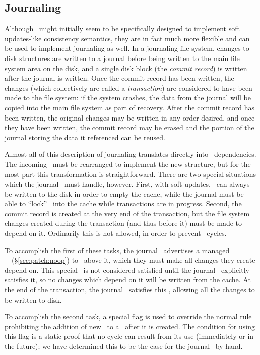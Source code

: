 \subsection{Journaling}
\label{sec:using:journal}

Although \chdescs\ might initially seem to be specifically designed to implement
soft updates-like consistency semantics, they are in fact much more flexible and
can be used to implement journaling as well. In a journaling file system,
changes to disk structures are written to a journal before being written to the
main file system area on the disk, and a single disk block (the \emph{commit
record}) is written after the journal is written. Once the commit record has
been written, the changes (which collectively are called a \emph{transaction})
are considered to have been made to the file system: if the system crashes, the
data from the journal will be copied into the main file system as part of
recovery. After the commit record has been written, the original changes may be
written in any order desired, and once they have been written, the commit record
may be erased and the portion of the journal storing the data it referenced can
be reused.

Almost all of this description of journaling translates directly into \chdesc\
dependencies. The incoming \chdescs\ must be rearranged to implement the new
structure, but for the most part this transformation is straightforward. There
are two special situations which the journal \module\ must handle, however.
First, with soft updates, \chdescs\ can always be written to the disk in order
to empty the cache, while the journal must be able to ``lock'' \chdescs\ into
the cache while transactions are in progress. Second, the commit record is
created at the very end of the transaction, but the file system changes created
during the transaction (and thus before it) must be made to depend on it.
Ordinarily this is not allowed, in order to prevent \chdesc\ cycles.

To accomplish the first of these tasks, the journal \module\ advertises a
managed \noop\ \chdesc\ (\S\ref{sec:patch:noop}) to \modules\ above it,
which they must make all changes they create depend on. This special \chdesc\ is
not considered satisfied until the journal \module\ explicitly satisfies it, so
no changes which depend on it will be written from the cache.  At the end of the
transaction, the journal \module\ satisfies this \chdesc, allowing all the
changes to be written to disk.

To accomplish the second task, a special flag is used to override the normal
rule prohibiting the addition of new \befores\ to a \chdesc\ after it is
created. The condition for using this flag is a static proof that no cycle can
result from its use (immediately or in the future); we have determined this to
be the case for the journal \module\ by hand.

